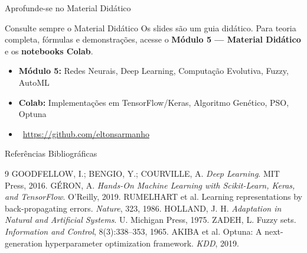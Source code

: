 \documentclass[aspectratio=169]{beamer}
\begin{document}
\begin{frame}{Aprofunde-se no Material Didático}
    \begin{alertblock}{Consulte sempre o Material Didático}
        Os slides são um guia didático. Para teoria completa, fórmulas e demonstrações, acesse o \textbf{Módulo 5 — Material Didático} e os \textbf{notebooks Colab}.
    \end{alertblock}
    \begin{itemize}
        \item \textbf{Módulo 5:} Redes Neurais, Deep Learning, Computação Evolutiva, Fuzzy, AutoML
        \item \textbf{Colab:} Implementações em TensorFlow/Keras, Algoritmo Genético, PSO, Optuna
        \item \faGithub\ \url{https://github.com/eltonsarmanho}
    \end{itemize}
\end{frame}

\begin{frame}{Referências Bibliográficas}
    \begin{thebibliography}{9}
         GOODFELLOW, I.; BENGIO, Y.; COURVILLE, A. \textit{Deep Learning}. MIT Press, 2016.
         GÉRON, A. \textit{Hands-On Machine Learning with Scikit-Learn, Keras, and TensorFlow}. O'Reilly, 2019.
         RUMELHART et al. Learning representations by back-propagating errors. \textit{Nature}, 323, 1986.
         HOLLAND, J. H. \textit{Adaptation in Natural and Artificial Systems}. U. Michigan Press, 1975.
         ZADEH, L. Fuzzy sets. \textit{Information and Control}, 8(3):338--353, 1965.
         AKIBA et al. Optuna: A next-generation hyperparameter optimization framework. \textit{KDD}, 2019.
    \end{thebibliography}
\end{frame}
\end{document}
